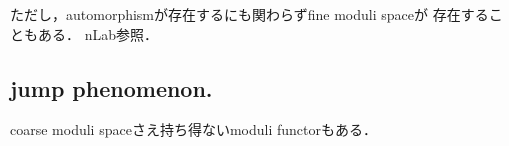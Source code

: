 \documentclass[a4paper]{jsarticle}
\begin{document}
    ただし，automorphismが存在するにも関わらずfine moduli spaceが
    存在することもある．
    nLab参照．

    \subsection{jump phenomenon.}
    coarse moduli spaceさえ持ち得ないmoduli functorもある．



\end{document}
